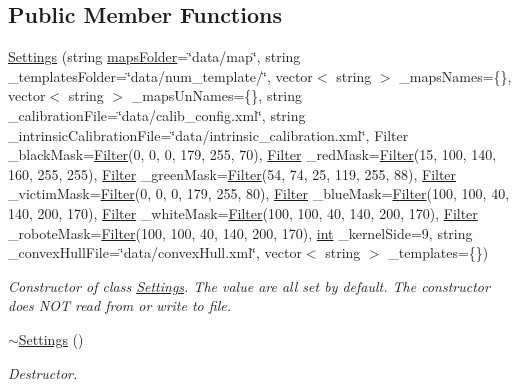 \subsection*{Public Member Functions}
\begin{DoxyCompactItemize}
\item 
\mbox{\hyperlink{class_settings_a751ee75eae398b1bc12ec5c37db9a170}{Settings}} (string \mbox{\hyperlink{class_settings_aeddfd4457036a14cb0a48d50d9e6ccfe}{maps\+Folder}}=\char`\"{}data/map\char`\"{}, string \+\_\+templates\+Folder=\char`\"{}data/num\+\_\+template/\char`\"{}, vector$<$ string $>$ \+\_\+maps\+Names=\{\}, vector$<$ string $>$ \+\_\+maps\+Un\+Names=\{\}, string \+\_\+calibration\+File=\char`\"{}data/calib\+\_\+config.\+xml\char`\"{}, string \+\_\+intrinsic\+Calibration\+File=\char`\"{}data/intrinsic\+\_\+calibration.\+xml\char`\"{}, Filter \+\_\+black\+Mask=\mbox{\hyperlink{class_filter}{Filter}}(0, 0, 0, 179, 255, 70), \mbox{\hyperlink{class_filter}{Filter}} \+\_\+red\+Mask=\mbox{\hyperlink{class_filter}{Filter}}(15, 100, 140, 160, 255, 255), \mbox{\hyperlink{class_filter}{Filter}} \+\_\+green\+Mask=\mbox{\hyperlink{class_filter}{Filter}}(54, 74, 25, 119, 255, 88), \mbox{\hyperlink{class_filter}{Filter}} \+\_\+victim\+Mask=\mbox{\hyperlink{class_filter}{Filter}}(0, 0, 0, 179, 255, 80), \mbox{\hyperlink{class_filter}{Filter}} \+\_\+blue\+Mask=\mbox{\hyperlink{class_filter}{Filter}}(100, 100, 40, 140, 200, 170), \mbox{\hyperlink{class_filter}{Filter}} \+\_\+white\+Mask=\mbox{\hyperlink{class_filter}{Filter}}(100, 100, 40, 140, 200, 170), \mbox{\hyperlink{class_filter}{Filter}} \+\_\+robote\+Mask=\mbox{\hyperlink{class_filter}{Filter}}(100, 100, 40, 140, 200, 170), \mbox{\hyperlink{draw_8hh_aa620a13339ac3a1177c86edc549fda9b}{int}} \+\_\+kernel\+Side=9, string \+\_\+convex\+Hull\+File=\char`\"{}data/convex\+Hull.\+xml\char`\"{}, vector$<$ string $>$ \+\_\+templates=\{\})
\begin{DoxyCompactList}\small\item\em Constructor of class \mbox{\hyperlink{class_settings}{Settings}}. The value are all set by default. The constructor does N\+OT read from or write to file. \end{DoxyCompactList}\item 
\mbox{\hyperlink{class_settings_a4a65be5921dfc9fddc476e5320541d89}{$\sim$\+Settings}} ()
\begin{DoxyCompactList}\small\item\em Destructor. \end{DoxyCompactList}\item 

\end{DoxyCompactItemize}
